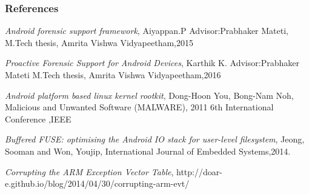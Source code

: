 \documentclass{beamer}
\begin{document}
\begin{frame}[allowframebreaks]
  \frametitle<presentation>{References}
  
  \begin{thebibliography}{10}
  \textit{Android forensic support framework},
  Aiyappan.P
  Advisor:Prabhaker Mateti,
  M.Tech thesis, Amrita
  Vishwa Vidyapeetham,2015
   
  \textit{Proactive Forensic Support for Android Devices},
  Karthik K. 
  Advisor:Prabhaker Mateti
  M.Tech thesis,
  Amrita Vishwa Vidyapeetham,2016 
  
    \textit{Android platform based linux kernel rootkit},
    Dong-Hoon You, Bong-Nam Noh,
    Malicious and Unwanted Software (MALWARE), 2011 6th International Conference ,IEEE
    
      \textit{Buffered FUSE: optimising the Android IO stack for user-level filesystem},
	  Jeong, Sooman and Won, Youjip,
      International Journal of Embedded Systems,2014.
      
      \textit{Corrupting the ARM Exception Vector Table},
      http://doar-e.github.io/blog/2014/04/30/corrupting-arm-evt/
      
    
    
    
    
    
    
 
  
   
 
  \end{thebibliography}
  
  
   
\end{frame}
\end{document}
